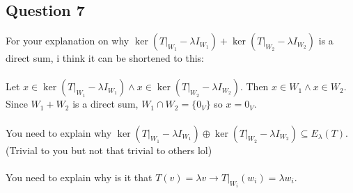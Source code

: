 \documentclass{article}
\begin{document}
\subsection*{Question 7}
For your explanation on why $\ker(T|_{W_1} - \lambda I_{W_1}) + \ker(T|_{W_2} - \lambda I_{W_2})$ is a direct sum, i think it can be shortened to this:\\\\
Let $x \in \ker(T|_{W_1} - \lambda I_{W_1}) \land x \in \ker(T|_{W_2} - \lambda I_{W_2})$. Then $x \in W_1 \land x \in W_2.$ Since $W_1 + W_2$ is a direct sum, $W_1 \cap W_2 = \{0_V\}$ so $x = 0_V.$\\\\
You need to explain why $\ker(T|_{W_1} - \lambda I_{W_1}) \oplus \ker(T|_{W_2} - \lambda I_{W_2}) \subseteq E_{\lambda}(T).$ (Trivial to you but not that trivial to others lol)\\\\
You need to explain why is it that $T(v) = \lambda v \to T|_{W_i}(w_i) = \lambda w_i.$
\end{document}
